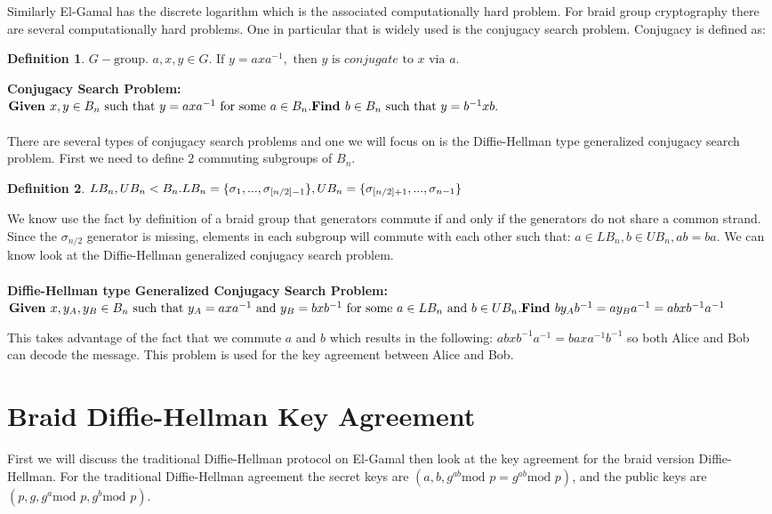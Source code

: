 \documentclass{article}
\theoremstyle{definition}
\newtheorem{definition}{Definition}[section]
\begin{document}
Similarly El-Gamal has the discrete logarithm which is the associated computationally hard problem. 
For braid group cryptography there are several computationally hard problems. One in particular that is widely used is the conjugacy search problem. Conjugacy is defined as:
\begin{definition} 
$G-\text{group. } a,x,y \in G. \text{ If }y=axa^{-1},\text{ then }y \text{ is } conjugate \text{ to }x \text{ via }a.$
\end{definition}

\noindent \textbf{Conjugacy Search Problem:} \\ $\textbf{Given }x,y \in B_n \text{ such that }y=axa^{-1} \text{ for some }a \in B_n. \\ \textbf{Find }b \in B_n \text{ such that }y=b^{-1}xb.$
\\ \\
There are several types of conjugacy search problems and one we will focus on is the Diffie-Hellman type generalized conjugacy search problem. First we need to define $2$ commuting subgroups of $B_n$. 


\begin{definition}
$LB_n,UB_n < B_n. \\ LB_n=\{ \sigma_1,...,\sigma_{[n/2]-1}  \}, UB_n=\{ \sigma_{[n/2]+1},...,\sigma_{n-1}  \} $
\end{definition}

We know use the fact by definition of a braid group that generators commute if and only if the generators do not share a common strand. Since the $\sigma_{n/2}$ generator is missing, elements in each subgroup will commute with each other such that: $a \in LB_n, b \in UB_n, ab=ba$. We can know look at the Diffie-Hellman generalized conjugacy search problem.
\\ \\
\textbf{Diffie-Hellman type Generalized Conjugacy Search Problem:} \\ $\textbf{Given }x,y_A, y_B \in B_n \text{ such that }y_A=axa^{-1} \text{ and } y_B=bxb^{-1} \text{ for some }a \in LB_n \text{ and }b \in UB_n. \\ \textbf{Find }by_Ab^{-1}=ay_Ba^{-1}=abxb^{-1}a^{-1}$

This takes advantage of the fact that we commute $a$ and $b$ which results in the following: $abxb^{-1}a^{-1}=baxa^{-1}b^{-1}$ so both Alice and Bob can decode the message. This problem is used for the key agreement between Alice and Bob.

\section{Braid Diffie-Hellman Key Agreement}
First we will discuss the traditional Diffie-Hellman protocol on El-Gamal then look at the key agreement for the braid version Diffie-Hellman. For the traditional Diffie-Hellman agreement the secret keys are $(a,b,g^{ab} \text{mod }p=g^{ab} \text{mod }p)$, and the public keys are $(p,g,g^a \text{mod }p,g^b \text{mod }p)$. 
\end{document}
